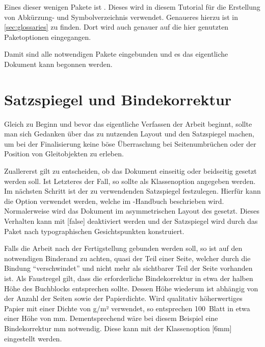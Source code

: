 \documentclass[english,ngerman]{tudscrartcl}
\begin{document}
%
Eines dieser wenigen Pakete ist . Dieses wird in diesem 
Tutorial für die Erstellung von Abkürzung- und Symbolverzeichnis verwendet. 
Genaueres hierzu ist in \autoref{sec:glossaries} zu finden. Dort wird auch 
genauer auf die hier genutzten Paketoptionen eingegangen.
%
\begin{Tutorial*}
\usepackage[%
  automake,%
  acronym,%
  symbols,%
  nomain,%
  translate=babel,%
  nogroupskip,%
  toc,%
  section=section,%
]{glossaries}
\makeglossaries
\end{Tutorial*}
%
Damit sind alle notwendigen Pakete eingebunden und es das eigentliche Dokument 
kann begonnen werden.
\begin{Tutorial*}
\begin{document}
\end{Tutorial*}



\section{Satzspiegel und Bindekorrektur}
Gleich zu Beginn und bevor das eigentliche Verfassen der Arbeit beginnt, sollte 
man sich Gedanken über das zu nutzenden Layout und den Satzspiegel machen, um 
bei der Finalisierung keine böse Überraschung bei Seitenumbrüchen oder der 
Position von Gleitobjekten zu erleben.

Zuallererst gilt zu entscheiden, ob das Dokument einseitig oder beidseitig 
gesetzt werden soll. Ist Letzteres der Fall, so sollte  als 
Klassenoption angegeben werden. Im nächsten Schritt ist der zu verwendenden 
Satzspiegel festzulegen. Hierfür kann die Option  verwendet 
werden, welche im \TUDScript-Handbuch beschrieben wird. Normalerweise wird das 
Dokument im asymmetrischen Layout des \CDs gesetzt. Dieses Verhalten kann mit 
[false] deaktiviert werden und der Satzspiegel wird durch das 
Paket  nach typographischen Gesichtspunkten konstruiert.

Falls die Arbeit nach der Fertigstellung gebunden werden soll, so ist auf den 
notwendigen Binderand zu achten, quasi der Teil einer Seite, welcher durch die 
Bindung \enquote{verschwindet} und nicht mehr als sichtbarer Teil der Seite 
vorhanden ist. Als Faustregel gilt, dass die erforderliche Bindekorrektur in 
etwa der halben Höhe des Buchblocks entsprechen sollte. Dessen Höhe wiederum 
ist abhängig von der Anzahl der Seiten sowie der Papierdichte. Wird qualitativ 
höherwertiges Papier mit einer Dichte von \unit[100]{g/m²} verwendet, so 
entsprechen 100~Blatt in etwa einer Höhe von \unit[12]{mm}. Dementsprechend 
wäre bei diesem Beispiel eine Bindekorrektur \unit[6]{mm} notwendig. Diese 
kann mit der Klassenoption [6mm] eingestellt werden.
\end{document}
